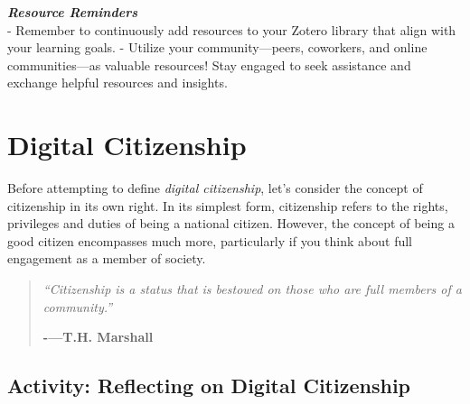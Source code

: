 \documentclass[
]{book}
\theoremstyle{definition}
\theoremstyle{definition}
\theoremstyle{definition}
\theoremstyle{definition}
\theoremstyle{remark}
\begin{document}
\begin{feedback}
\textbf{\emph{Resource Reminders}}\\
- Remember to continuously add resources to your Zotero library that
align with your learning goals. - Utilize your community---peers,
coworkers, and online communities---as valuable resources! Stay engaged
to seek assistance and exchange helpful resources and insights.
\end{feedback}

\hypertarget{digital-citizenship}{%
\section{Digital Citizenship}\label{digital-citizenship}}

Before attempting to define \emph{digital citizenship}, let's consider the concept of citizenship in its own right. In its simplest form, citizenship refers to the rights, privileges and duties of being a national citizen. However, the concept of being a good citizen encompasses much more, particularly if you think about full engagement as a member of society.

\begin{quote}
\emph{``Citizenship is a status that is bestowed on those who are full members of a community.''}

\textbf{-\/---T.H. Marshall}
\end{quote}

\hypertarget{activity-reflecting-on-digital-citizenship}{%
\subsection*{Activity: Reflecting on Digital Citizenship}\label{activity-reflecting-on-digital-citizenship}}
\end{document}
